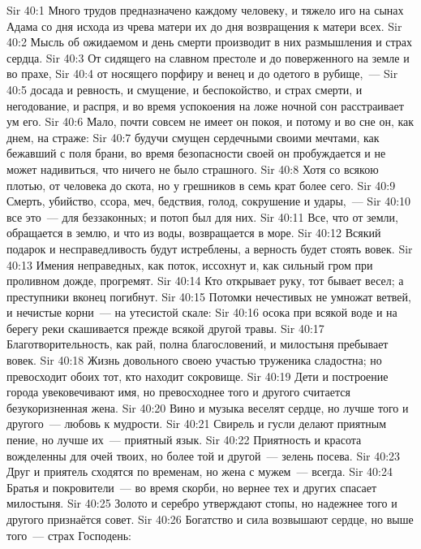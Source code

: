 \vs Sir 40:1 Много трудов предназначено каждому человеку, и тяжело иго на сынах Адама со дня исхода из чрева матери их до дня возвращения к матери всех.
\vs Sir 40:2 Мысль об ожидаемом и день смерти производит в них размышления и страх сердца.
\vs Sir 40:3 От сидящего на славном престоле и до поверженного на земле и во прахе,
\vs Sir 40:4 от носящего порфиру и венец и до одетого в рубище,~---
\vs Sir 40:5  досада и ревность, и смущение, и беспокойство, и страх смерти, и негодование, и распря, и во время успокоения на ложе ночной сон расстраивает ум его.
\vs Sir 40:6 Мало, почти совсем не имеет он покоя, и потому и во сне он, как днем, на страже:
\vs Sir 40:7 будучи смущен сердечными своими мечтами, как бежавший с поля брани, во время безопасности своей он пробуждается и не может надивиться, что ничего не было страшного.
\vs Sir 40:8 Хотя  со всякою плотью, от человека до скота, но у грешников в семь крат более сего.
\vs Sir 40:9 Смерть, убийство, ссора, меч, бедствия, голод, сокрушение и удары,~---
\vs Sir 40:10 все это~--- для беззаконных; и потоп был для них.
\vs Sir 40:11 Все, что от земли, обращается в землю, и что из воды, возвращается в море.
\vs Sir 40:12 Всякий подарок и несправедливость будут истреблены, а верность будет стоять вовек.
\vs Sir 40:13 Имения неправедных, как поток, иссохнут и, как сильный гром при проливном дожде, прогремят.
\vs Sir 40:14 Кто открывает руку, тот бывает весел; а преступники вконец погибнут.
\vs Sir 40:15 Потомки нечестивых не умножат ветвей, и нечистые корни~--- на утесистой скале:
\vs Sir 40:16 осока при всякой воде и на берегу реки скашивается прежде всякой другой травы.
\vs Sir 40:17 Благотворительность, как рай, полна благословений, и милостыня пребывает вовек.
\vs Sir 40:18 Жизнь довольного своею участью  труженика сладостна; но превосходит обоих тот, кто находит сокровище.
\vs Sir 40:19 Дети и построение города увековечивают имя, но превосходнее того и другого считается безукоризненная жена.
\vs Sir 40:20 Вино и музыка веселят сердце, но лучше того и другого~--- любовь к мудрости.
\vs Sir 40:21 Свирель и гусли делают приятным пение, но лучше их~--- приятный язык.
\vs Sir 40:22 Приятность и красота вожделенны для очей твоих, но более той и другой~--- зелень посева.
\vs Sir 40:23 Друг и приятель сходятся по временам, но жена с мужем~--- всегда.
\vs Sir 40:24 Братья и покровители~--- во время скорби, но вернее тех и других спасает милостыня.
\vs Sir 40:25 Золото и серебро утверждают стопы, но надежнее того и другого признаётся  совет.
\vs Sir 40:26 Богатство и сила возвышают сердце, но выше того~--- страх Господень:
